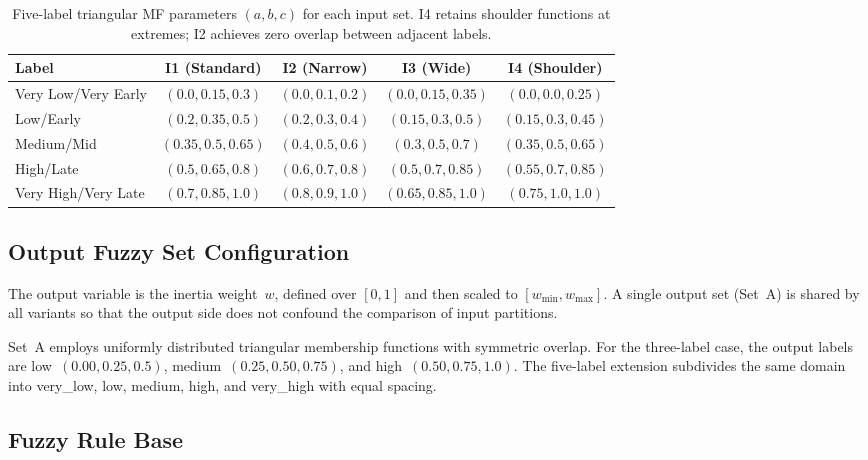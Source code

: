 \documentclass[conference]{IEEEtran}
\begin{document}
\begin{table}[htbp]
    \caption{Five-label triangular MF parameters $(a, b, c)$ for each input set. I4 retains shoulder functions at extremes; I2 achieves zero overlap between adjacent labels.}
    \label{tab:input_sets_5L}
    \centering
    \begin{tabular}{lcccc}
    \toprule
    Label & I1 (Standard) & I2 (Narrow) & I3 (Wide) & I4 (Shoulder) \\
    \midrule
    Very Low/Very Early & $(0.0, 0.15, 0.3)$  & $(0.0, 0.1, 0.2)$  & $(0.0, 0.15, 0.35)$  & $(0.0, 0.0, 0.25)$  \\
    Low/Early           & $(0.2, 0.35, 0.5)$  & $(0.2, 0.3, 0.4)$  & $(0.15, 0.3, 0.5)$ & $(0.15, 0.3, 0.45)$ \\
    Medium/Mid          & $(0.35, 0.5, 0.65)$ & $(0.4, 0.5, 0.6)$  & $(0.3, 0.5, 0.7)$  & $(0.35, 0.5, 0.65)$ \\
    High/Late           & $(0.5, 0.65, 0.8)$  & $(0.6, 0.7, 0.8)$  & $(0.5, 0.7, 0.85)$  & $(0.55, 0.7, 0.85)$ \\
    Very High/Very Late & $(0.7, 0.85, 1.0)$  & $(0.8, 0.9, 1.0)$  & $(0.65, 0.85, 1.0)$ & $(0.75, 1.0, 1.0)$  \\
    \bottomrule
    \end{tabular}
\end{table}

\subsection{Output Fuzzy Set Configuration}
\label{subsec:output_set}

The output variable is the inertia weight~$w$, defined over $[0, 1]$ and then scaled to $[w_{\min}, w_{\max}]$. A single output set (Set~A) is shared by all variants so that the output side does not confound the comparison of input partitions.

Set~A employs uniformly distributed triangular membership functions with symmetric overlap. For the three-label case, the output labels are low~$(0.00, 0.25, 0.5)$, medium~$(0.25, 0.50, 0.75)$, and high~$(0.50, 0.75, 1.0)$. The five-label extension subdivides the same domain into very\_low, low, medium, high, and very\_high with equal spacing.

\subsection{Fuzzy Rule Base}
\label{subsec:rule_base}
\end{document}
